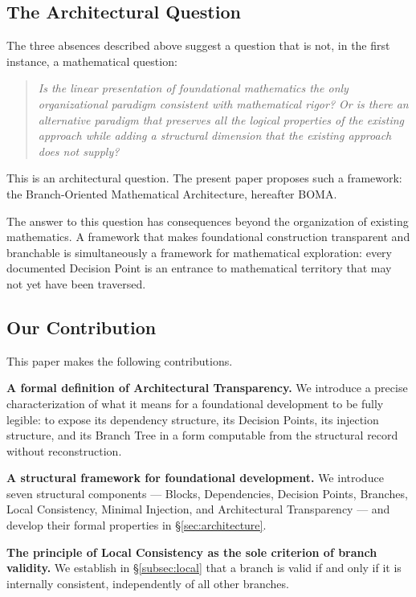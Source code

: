 \documentclass[12pt, a4paper]{article}
\theoremstyle{plain}
\theoremstyle{definition}
\theoremstyle{remark}
\newcommand{\BOMA}{\textsf{BOMA}}
\begin{document}
\subsection{The Architectural Question}
\label{subsec:architecture}

The three absences described above suggest a question that is
not, in the first instance, a mathematical question:
\begin{quote}
\emph{Is the linear presentation of foundational mathematics the
only organizational paradigm consistent with mathematical rigor?
Or is there an alternative paradigm that preserves all the
logical properties of the existing approach while adding a
structural dimension that the existing approach does not supply?}
\end{quote}
This is an architectural question. The present paper proposes
such a framework: the Branch-Oriented Mathematical Architecture,
hereafter \BOMA{}.

The answer to this question has consequences beyond the
organization of existing mathematics. A framework that makes
foundational construction transparent and branchable is
simultaneously a framework for mathematical exploration: every
documented Decision Point is an entrance to mathematical
territory that may not yet have been traversed.

\subsection{Our Contribution}
\label{subsec:contribution}

This paper makes the following contributions.

\textbf{A formal definition of Architectural Transparency.}
We introduce a precise characterization of what it means for a
foundational development to be fully legible: to expose its
dependency structure, its Decision Points, its injection
structure, and its Branch Tree in a form computable from the
structural record without reconstruction.

\textbf{A structural framework for foundational development.}
We introduce seven structural components --- Blocks, Dependencies,
Decision Points, Branches, Local Consistency, Minimal Injection,
and Architectural Transparency --- and develop their formal
properties in \S\ref{sec:architecture}.

\textbf{The principle of Local Consistency as the sole criterion
of branch validity.} We establish in \S\ref{subsec:local} that a
branch is valid if and only if it is internally consistent,
independently of all other branches.
\end{document}

